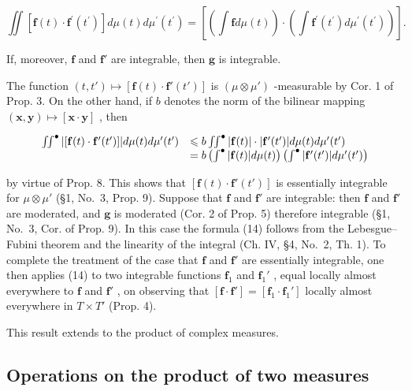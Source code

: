 \[
\iint \left[ \mathbf {f} (t) \cdot \mathbf {f} ^ {\prime} \left(t ^ {\prime}\right) \right] d \mu (t) d \mu^ {\prime} \left(t ^ {\prime}\right) = \left[ \left(\int \mathbf {f} d \mu (t)\right) \cdot \left(\int \mathbf {f} ^ {\prime} \left(t ^ {\prime}\right) d \mu^ {\prime} \left(t ^ {\prime}\right)\right) \right].\tag{14}
\]

If, moreover, \(\mathbf{f}\) and \(\mathbf{f}'\) are integrable, then \(\mathbf{g}\) is integrable.

The function \((t, t') \mapsto [\mathbf{f}(t) \cdot \mathbf{f}'(t')]\) is \((\mu \otimes \mu')\) -measurable by Cor. 1 of Prop. 3. On the other hand, if \(b\) denotes the norm of the bilinear mapping \((\mathbf{x}, \mathbf{y}) \mapsto [\mathbf{x} \cdot \mathbf{y}]\) , then

\[
\begin{array}{r l} \iint^ {\bullet} | [ \mathbf {f} (t) \cdot \mathbf {f} ^ {\prime} (t ^ {\prime}) ] | d \mu (t) d \mu^ {\prime} (t ^ {\prime}) & \leqslant b \iint^ {\bullet} | \mathbf {f} (t) | \cdot | \mathbf {f} ^ {\prime} (t ^ {\prime}) | d \mu (t) d \mu^ {\prime} (t ^ {\prime}) \\ & = b \left(\int^ {\bullet} | \mathbf {f} (t) | d \mu (t)\right) \left(\int^ {\bullet} | \mathbf {f} ^ {\prime} (t ^ {\prime}) | d \mu^ {\prime} (t ^ {\prime})\right) \end{array}
\]

by virtue of Prop. 8. This shows that \([\mathbf{f}(t) \cdot \mathbf{f}'(t')]\) is essentially integrable for \(\mu \otimes \mu'\) (§1, No.~3, Prop. 9). Suppose that \(\mathbf{f}\) and \(\mathbf{f}'\) are integrable: then \(\mathbf{f}\) and \(\mathbf{f}'\) are moderated, and \(\mathbf{g}\) is moderated (Cor. 2 of Prop. 5) therefore integrable (§1, No.~3, Cor. of Prop. 9). In this case the formula (14) follows from the Lebesgue--Fubini theorem and the linearity of the integral (Ch. IV, §4, No.~2, Th. 1). To complete the treatment of the case that \(\mathbf{f}\) and \(\mathbf{f}'\) are essentially integrable, one then applies (14) to two integrable functions \(\mathbf{f}_1\) and \(\mathbf{f}_1'\) , equal locally almost everywhere to \(\mathbf{f}\) and \(\mathbf{f}'\) , on observing that \([\mathbf{f} \cdot \mathbf{f}'] = [\mathbf{f}_1 \cdot \mathbf{f}_1']\) locally almost everywhere in \(T \times T'\) (Prop. 4).

This result extends to the product of complex measures.

\subsection{Operations on the product of two measures}

